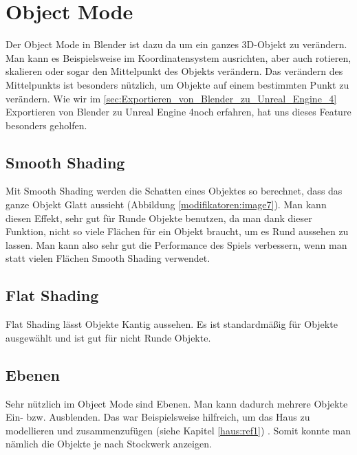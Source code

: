 \section{Object Mode}
Der Object Mode in Blender ist dazu da um ein ganzes 3D-Objekt zu verändern. Man kann es Beispielsweise im Koordinatensystem ausrichten, aber
auch rotieren, skalieren oder sogar den Mittelpunkt des Objekts verändern. Das verändern des Mittelpunkts ist besonders nützlich, um Objekte auf
einem bestimmten Punkt zu verändern. Wie wir im \autoref{sec:Exportieren_von_Blender_zu_Unreal_Engine_4} \dq Exportieren von Blender zu Unreal Engine 4\dq noch erfahren, hat uns dieses Feature besonders geholfen.

\subsection{Smooth Shading}
\label{objectMode:smoothshading}
Mit Smooth Shading werden die Schatten eines Objektes so berechnet, dass das ganze Objekt Glatt aussieht (Abbildung \ref{modifikatoren:image7}).
Man kann diesen Effekt, sehr gut für Runde Objekte benutzen, da man dank dieser Funktion, nicht so viele Flächen für ein Objekt braucht, um
es Rund aussehen zu lassen. Man kann also sehr gut die Performance des Spiels verbessern, wenn man statt vielen Flächen Smooth Shading verwendet.

\subsection{Flat Shading}
Flat Shading lässt Objekte Kantig aussehen. Es ist standardmäßig für Objekte ausgewählt und ist gut für nicht Runde Objekte.

\subsection{Ebenen}
Sehr nützlich im Object Mode sind Ebenen. Man kann dadurch mehrere Objekte Ein- bzw. Ausblenden.
Das war Beispielsweise hilfreich, um das Haus zu modellieren und zusammenzufügen (siehe Kapitel \ref{haus:ref1}) .
Somit konnte man nämlich die Objekte je nach Stockwerk anzeigen.
